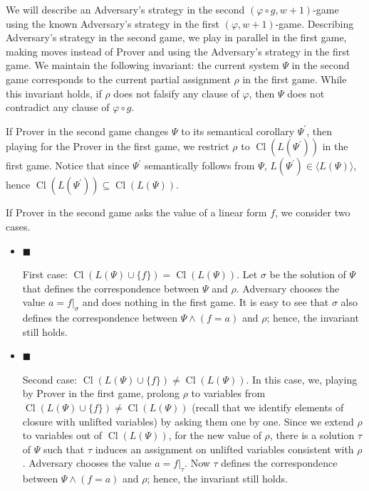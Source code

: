 \documentclass[10pt,a4paper]{article}
\begin{document}
We will describe an Adversary’s strategy in the second $(\varphi\circ g,w+1)$-game using the known Adversary’s strategy in the first $(\varphi,w+1)$-game. Describing Adversary’s strategy in the second game, we play in parallel in the first game, making moves instead of Prover and using the Adversary’s strategy in the first game. We maintain the following invariant: the current system $\Psi$ in the second game corresponds to the current partial assignment $\rho$ in the first game. While this invariant holds, if $\rho$ does not falsify any clause of $\varphi$, then $\Psi$ does not contradict any clause of $\varphi\circ g$.\par



If Prover in the second game changes $\Psi$ to its semantical corollary $\Psi^{\prime}$, then playing for the Prover in the first game, we restrict $\rho$ to $\mathop{\mathrm{Cl}}(L(\Psi^{\prime}))$ in the first game. Notice that since $\Psi^{\prime}$ semantically follows from $\Psi$, $L(\Psi^{\prime})\in\langle L(\Psi)\rangle$, hence $\mathop{\mathrm{Cl}}(L(\Psi^{\prime}))\subseteq\mathop{\mathrm{Cl}}(L(\Psi))$.\par



If Prover in the second game asks the value of a linear form $f$, we consider two cases.\par


\begin{itemize}


\item 
$\blacksquare$ 


First case: $\mathop{\mathrm{Cl}}(L(\Psi)\cup\{f\})=\mathop{\mathrm{Cl}}(L(\Psi))$. Let $\sigma$ be the solution of $\Psi$ that defines the correspondence between $\Psi$ and $\rho$. Adversary chooses the value $a=f|_{\sigma}$ and does nothing in the first game. It is easy to see that $\sigma$ also defines the correspondence between $\Psi\land(f=a)$ and $\rho$; hence, the invariant still holds.\par





\item 
$\blacksquare$ 


Second case: $\mathop{\mathrm{Cl}}(L(\Psi)\cup\{f\})\neq\mathop{\mathrm{Cl}}(L(\Psi))$. In this case, we, playing by Prover in the first game, prolong $\rho$ to variables from $\mathop{\mathrm{Cl}}(L(\Psi)\cup\{f\})\neq\mathop{\mathrm{Cl}}(L(\Psi))$ (recall that we identify elements of closure with unlifted variables) by asking them one by one. Since we extend $\rho$ to variables out of $\mathop{\mathrm{Cl}}(L(\Psi))$, for the new value of $\rho$, there is a solution $\tau$ of $\Psi$ such that $\tau$ induces an assignment on unlifted variables consistent with $\rho$. Adversary chooses the value $a=f|_{\tau}$. Now $\tau$ defines the correspondence between $\Psi\land(f=a)$ and $\rho$; hence, the invariant still holds.\par





\end{itemize}
\end{document}
